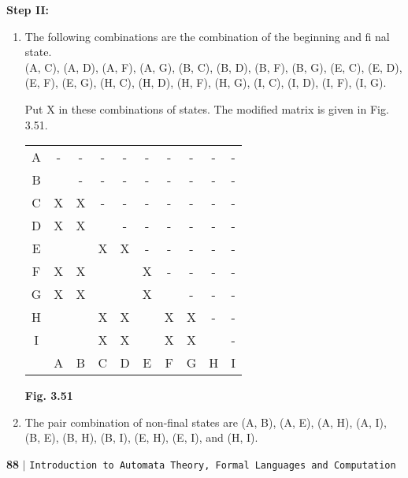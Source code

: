 \documentclass{article}
\begin{document}
\vspace*{0.2cm}
\small{
\textbf{Step II:}
\begin{enumerate}
  \item The following combinations are the combination of the beginning and fi nal state.\\
(A, C), (A, D), (A, F), (A, G), (B, C), (B, D), (B, F), (B, G), (E, C), (E, D), (E, F), (E, G), (H, C),
(H, D), (H, F), (H, G), (I, C), (I, D), (I, F), (I, G).

Put X in these combinations of states. The modified matrix is given in Fig. 3.51.\\


\begin{center}
\begin{tabular}{cccccccccc}
\hline
A& -& -& -& -& -& -& -& -& -\\
B&  & -& -& -& -& -& -& -& -\\
C&X &X & -& -& -& -& -& -& -\\
D&X &X &  & -& -& -& -& -& -\\
E&  &  &X &X & -& -& -& -& -\\
F&X &X &  &  &X & -& -& -& -\\
G&X &X &  &  &X &  & -& -& -\\
H&  &  &X &X &  &X &X & -& -\\
I&  &  &X &X &  &X &X &  & -\\
 & A& B& C& D& E& F& G& H& I\\
 \hline

 \hline

 \hline

 \hline
\end{tabular}
\end{center}
\begin{center}
  \textbf{Fig. 3.51}\\
\end{center}
  \item The pair combination of non-final states are (A, B), (A, E), (A, H), (A, I), (B, E), (B, H), (B, I),
(E, H), (E, I), and (H, I).
\end{enumerate}
}

\newpage
\begin{flushleft}
    \textbf{88}\hspace*{0.1cm} \textbf{$|$} \hspace*{0.1cm} \texttt{Introduction to Automata Theory, Formal Languages and Computation}
  \end{flushleft}
\end{document}
